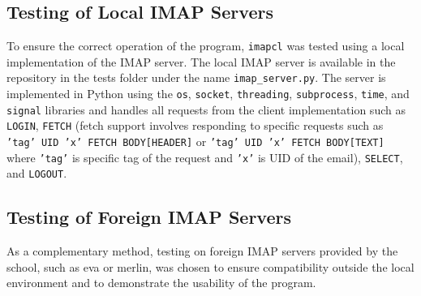 \documentclass[a4paper,11pt]{article}
\begin{document}
\subsection{Testing of Local IMAP Servers}
To ensure the correct operation of the program, \texttt{imapcl} was tested using a local 
implementation of the IMAP server. The local IMAP server is available in the repository 
in the tests folder under the name \texttt{imap\_server.py}. The server is implemented in Python 
using the \texttt{os}, \texttt{socket}, \texttt{threading}, \texttt{subprocess}, 
\texttt{time}, and \texttt{signal} libraries and handles all requests from the client 
implementation such as \texttt{LOGIN}, \texttt{FETCH} (fetch support involves responding to 
specific requests such as \texttt{'tag' UID 'x' FETCH BODY[HEADER]} or \texttt{'tag' UID 'x' FETCH BODY[TEXT]} 
where \texttt{'tag'} is specific tag of the request and \texttt{'x'} is UID of the email), 
\texttt{SELECT}, and \texttt{LOGOUT}.

\subsection{Testing of Foreign IMAP Servers}
As a complementary method, testing on foreign IMAP servers provided by the school, such as eva 
or merlin, was chosen to ensure compatibility outside the local environment and to demonstrate 
the usability of the program.
\end{document}
